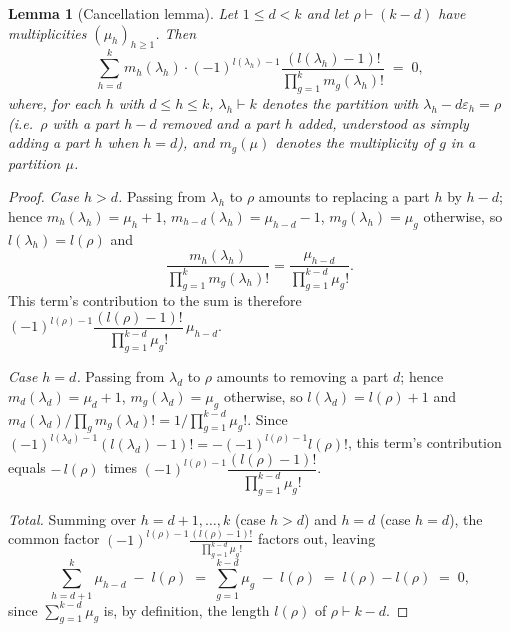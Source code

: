 \documentclass[10pt,a4paper]{amsart}
\newtheorem{lemma}[theorem]{Lemma}
\begin{document}
\begin{lemma}[Cancellation lemma]\label{lem:cancel}
Let $1\le d<k$ and let $\rho\vdash(k-d)$ have multiplicities $(\mu_h)_{h\ge1}$. Then
\[
\sum_{h=d}^{k} m_h(\lambda_h)\cdot(-1)^{l(\lambda_h)-1}\frac{(l(\lambda_h)-1)!}{\prod_{g=1}^k m_g(\lambda_h)!} \;=\; 0,
\]
where, for each $h$ with $d\le h\le k$, $\lambda_h\vdash k$ denotes the partition with $\lambda_h-d\varepsilon_h=\rho$ (i.e.\ $\rho$ with a part $h-d$ removed and a part $h$ added, understood as simply adding a part $h$ when $h=d$), and $m_g(\mu)$ denotes the multiplicity of $g$ in a partition $\mu$.
\end{lemma}

\begin{proof}
\emph{Case $h>d$.} Passing from $\lambda_h$ to $\rho$ amounts to replacing a part $h$ by $h-d$; hence $m_h(\lambda_h)=\mu_h+1$, $m_{h-d}(\lambda_h)=\mu_{h-d}-1$, $m_g(\lambda_h)=\mu_g$ otherwise, so $l(\lambda_h)=l(\rho)$ and
\[
\frac{m_h(\lambda_h)}{\prod_{g=1}^k m_g(\lambda_h)!} = \frac{\mu_{h-d}}{\prod_{g=1}^{k-d}\mu_g!}.
\]
This term's contribution to the sum is therefore $(-1)^{l(\rho)-1}\dfrac{(l(\rho)-1)!}{\prod_{g=1}^{k-d}\mu_g!}\,\mu_{h-d}$.

\emph{Case $h=d$.} Passing from $\lambda_d$ to $\rho$ amounts to removing a part $d$; hence $m_d(\lambda_d)=\mu_d+1$, $m_g(\lambda_d)=\mu_g$ otherwise, so $l(\lambda_d)=l(\rho)+1$ and $m_d(\lambda_d)/\prod_g m_g(\lambda_d)! = 1/\prod_{g=1}^{k-d}\mu_g!$. Since $(-1)^{l(\lambda_d)-1}(l(\lambda_d)-1)! = -(-1)^{l(\rho)-1}l(\rho)!$, this term's contribution equals $-\,l(\rho)$ times $(-1)^{l(\rho)-1}\dfrac{(l(\rho)-1)!}{\prod_{g=1}^{k-d}\mu_g!}$.

\emph{Total.} Summing over $h=d+1,\dots,k$ (case $h>d$) and $h=d$ (case $h=d$), the common factor $(-1)^{l(\rho)-1}\frac{(l(\rho)-1)!}{\prod_{g=1}^{k-d}\mu_g!}$ factors out, leaving
\[
\sum_{h=d+1}^{k}\mu_{h-d} \;-\; l(\rho) \;=\; \sum_{g=1}^{k-d}\mu_g \;-\; l(\rho) \;=\; l(\rho) - l(\rho) \;=\; 0,
\]
since $\sum_{g=1}^{k-d}\mu_g$ is, by definition, the length $l(\rho)$ of $\rho\vdash k-d$.
\end{proof}
\end{document}
